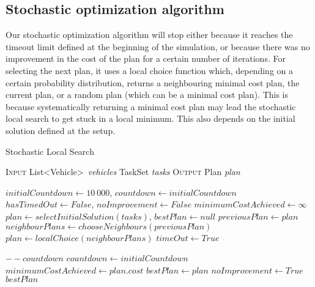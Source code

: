 \documentclass[10pt]{article}
\begin{document}
\subsection{Stochastic optimization algorithm}
Our stochastic optimization algorithm will stop either because it reaches the timeout limit defined at the beginning of the simulation, or because there was no improvement in the cost of the plan for a certain number of iterations.
For selecting the next plan, it uses a local choice function which, depending on a certain probability distribution, returns a neighbouring minimal cost plan, the current plan, or a random plan (which can be a minimal cost plan). This is because systematically returning a minimal cost plan may lead the stochastic local search to get stuck in a local minimum. This also depends on the initial solution defined at the setup.

\begin{algorithm}[h]
\caption{Stochastic Local Search}
\begin{algorithmic}[0]
\Statex \textsc{Input}
\Statex \hspace{\algorithmicindent} List\textless Vehicle\textgreater\ \textit{vehicles} 
\Statex \hspace{\algorithmicindent} TaskSet \textit{tasks} 
\Statex \textsc{Output}
\Statex \hspace{\algorithmicindent} Plan \textit{plan} 

\State
\State $initialCountdown \gets 10\ 000$, $countdown \gets initialCountdown$ 
\State $hasTimedOut \gets False$, $noImprovement \gets False$
\State $minimumCostAchieved \gets  \infty$
\State $plan \gets  selectInitialSolution(tasks)$, $bestPlan \gets null$
\State
{}
\State $previousPlan \gets plan$
\State $neighbourPlans \gets chooseNeighbours(previousPlan)$ 
\State $plan \gets localChoice(neighbourPlans)$ 
\State
{}  
	\State $timeOut \gets True$ 
\EndIf                          {}

	\State $--countdown$
\Else
	\State $countdown \gets initialCountdown$
	\State $minimumCostAchieved \gets plan.cost$
	\State $bestPlan \gets plan$
\EndIf
{}
	\State $noImprovement \gets True$
\EndIf
\EndWhile
\State \Return $bestPlan$
\end{algorithmic}
\end{algorithm}
\end{document}
